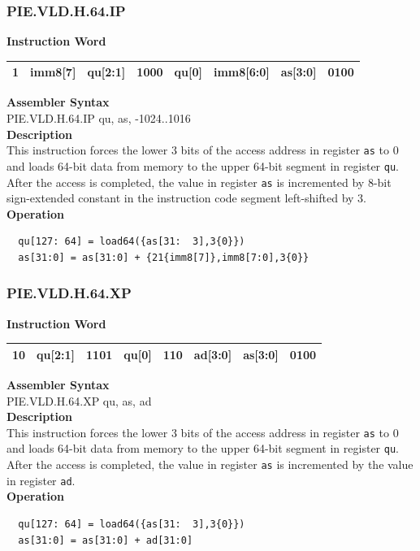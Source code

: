 \newpage
\subsubsection{PIE.VLD.H.64.IP}\label{instruction:PIEVLDH64IP}
\setlength\tabcolsep{6pt}
\textbf{Instruction Word} \\
\begin{tabular}{|c|c|c|c|c|c|c|c|}
	\hline
	1 & imm8[7] & qu[2:1] & 1000 & qu[0] & imm8[6:0] & as[3:0] & 0100 \\
	\hline
\end{tabular}

\textbf{Assembler Syntax} \\
PIE.VLD.H.64.IP qu, as, -1024..1016 \\
\textbf{Description} \\
This instruction forces the lower 3 bits of the access address in register \lstinline{as} to 0 and loads 64-bit data from memory to the upper 64-bit segment in register \lstinline{qu}. After the access is completed, the value in register \lstinline{as} is incremented by 8-bit sign-extended constant in the instruction code segment left-shifted by 3.\\
\textbf{Operation}
\begin{lstlisting}
  qu[127: 64] = load64({as[31:  3],3{0}})
  as[31:0] = as[31:0] + {21{imm8[7]},imm8[7:0],3{0}}
\end{lstlisting}

\newpage
\subsubsection{PIE.VLD.H.64.XP}\label{instruction:PIEVLDH64XP}
\setlength\tabcolsep{6pt}
\textbf{Instruction Word} \\
\begin{tabular}{|c|c|c|c|c|c|c|c|}
	\hline
	10 & qu[2:1] & 1101 & qu[0] & 110 & ad[3:0] & as[3:0] & 0100 \\
	\hline
\end{tabular}

\textbf{Assembler Syntax} \\
PIE.VLD.H.64.XP qu, as, ad \\
\textbf{Description} \\
This instruction forces the lower 3 bits of the access address in register \lstinline{as} to 0 and loads 64-bit data from memory to the upper 64-bit segment in register \lstinline{qu}. After the access is completed, the value in register \lstinline{as} is incremented by the value in register \lstinline{ad}.\\
\textbf{Operation}
\begin{lstlisting}
  qu[127: 64] = load64({as[31:  3],3{0}})
  as[31:0] = as[31:0] + ad[31:0]
\end{lstlisting}

